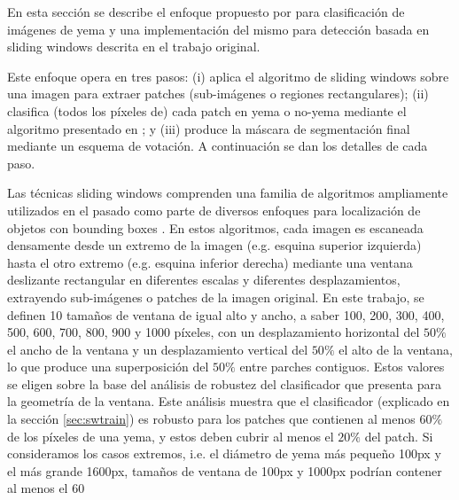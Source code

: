 \documentclass[a4paper,authoryear,review]{elsarticle}
\begin{document}
En esta sección se describe el enfoque propuesto por \citet{perez2017image} para clasificación de imágenes de yema y una implementación del mismo para detección basada en sliding windows descrita en el trabajo original.

Este enfoque opera en tres pasos: (i) aplica el algoritmo de sliding windows sobre una imagen para extraer patches (sub-imágenes o regiones rectangulares); (ii) clasifica (todos los píxeles de) cada patch en yema o no-yema mediante el algoritmo presentado en \citet{perez2017image}; y (iii) produce la máscara de segmentación final mediante un esquema de votación. A continuación se dan los detalles de cada paso.

Las técnicas sliding windows comprenden una familia de algoritmos ampliamente utilizados en el pasado como parte de diversos enfoques para localización de objetos con bounding boxes \citep{divvala2009empirical, wang2009hog, chum2007exemplar, ferrari2007groups, dalal2005histograms, rowley1996human}. En estos algoritmos, cada imagen es escaneada densamente desde un extremo de la imagen (e.g. esquina superior izquierda) hasta el otro extremo (e.g. esquina inferior derecha) mediante una ventana deslizante rectangular en diferentes escalas y diferentes desplazamientos, extrayendo sub-imágenes o patches de la imagen original. En este trabajo, se definen 10 tamaños de ventana de igual alto y ancho, a saber 100, 200, 300, 400, 500, 600, 700, 800, 900 y 1000 píxeles, con un desplazamiento horizontal del $50\%$ el ancho de la ventana y un desplazamiento vertical del $50\%$ el alto de la ventana, lo que produce una superposición del $50\%$ entre parches contiguos. Estos valores se eligen sobre la base del análisis de robustez del clasificador que presenta \citet{perez2017image} para la geometría de la ventana. Este análisis muestra que el clasificador (explicado en la sección \ref{sec:swtrain}) es robusto para los patches que contienen al menos $60\%$ de los píxeles de una yema, y estos deben cubrir al menos el $20\%$ del patch. Si consideramos los casos extremos, i.e. el diámetro de yema más pequeño 100px y el más grande 1600px, tamaños de ventana de 100px y 1000px podrían contener al menos el 60%
\end{document}
